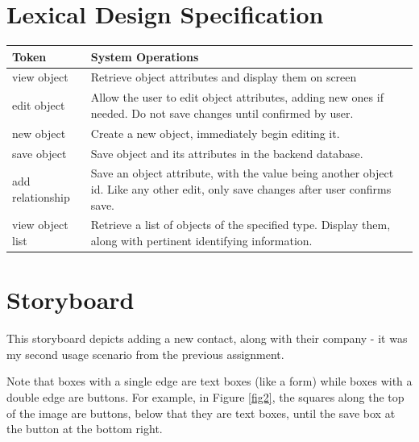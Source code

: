 \documentclass[12pt, letter]{article}
\begin{document}
\section{Lexical Design Specification}
\begin{tabular}[H]{|m{2.5cm} | m{15cm}|}
\hline
Token & System Operations \\
\hline
view object & Retrieve object attributes and display them on screen \\
edit object & Allow the user to edit object attributes, adding new ones if needed.  Do not save changes until confirmed by user.  \\
new object & Create a new object, immediately begin editing it.\\
save object & Save object and its attributes in the backend database.\\
add relationship & Save an object attribute, with the value being another object id. Like any other edit, only save changes after user confirms save.\\
view object list & Retrieve a list of objects of the specified type.  Display them, along with pertinent identifying information. \\
\hline

\end{tabular}

\section{Storyboard}

This storyboard depicts adding a new contact, along with their company - it was my second usage scenario from the previous assignment.

Note that boxes with a single edge are text boxes (like a form) while boxes with a double edge are buttons.  For example, in Figure \ref{fig2}, the squares along the top of the image are buttons, below that they are text boxes, until the save box at the button at the bottom right.
\end{document}

